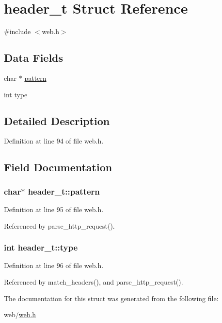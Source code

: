 \hypertarget{structheader__t}{\section{header\-\_\-t Struct Reference}
\label{structheader__t}
}


{\ttfamily \#include $<$web.\-h$>$}

\subsection*{Data Fields}
\begin{DoxyCompactItemize}
\item 
char $\ast$ \hyperlink{structheader__t_a389d7564d1b1fd7b7ace82e15525e18c}{pattern}
\item 
int \hyperlink{structheader__t_a1f179d0a706f9ec29e1ac8ef9e67b8af}{type}
\end{DoxyCompactItemize}


\subsection{Detailed Description}


Definition at line 94 of file web.\-h.



\subsection{Field Documentation}
\hypertarget{structheader__t_a389d7564d1b1fd7b7ace82e15525e18c}{
\subsubsection[{pattern}]{\setlength{\rightskip}{0pt plus 5cm}char$\ast$ header\-\_\-t\-::pattern}}\label{structheader__t_a389d7564d1b1fd7b7ace82e15525e18c}


Definition at line 95 of file web.\-h.



Referenced by parse\-\_\-http\-\_\-request().

\hypertarget{structheader__t_a1f179d0a706f9ec29e1ac8ef9e67b8af}{
\subsubsection[{type}]{\setlength{\rightskip}{0pt plus 5cm}int header\-\_\-t\-::type}}\label{structheader__t_a1f179d0a706f9ec29e1ac8ef9e67b8af}


Definition at line 96 of file web.\-h.



Referenced by match\-\_\-headers(), and parse\-\_\-http\-\_\-request().



The documentation for this struct was generated from the following file\-:\begin{DoxyCompactItemize}
\item 
web/\hyperlink{web_8h}{web.\-h}\end{DoxyCompactItemize}
